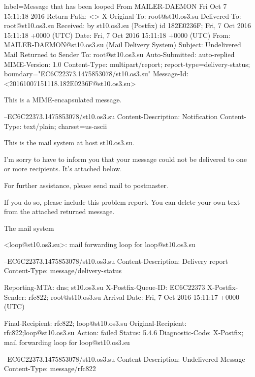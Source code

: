 \documentclass[a4paper,11pt]{article}
\begin{document}
\begin{bashcode*}{label=Message that has been looped}
From MAILER-DAEMON  Fri Oct  7 15:11:18 2016
Return-Path: <>
X-Original-To: root@st10.os3.su
Delivered-To: root@st10.os3.su
Received: by st10.os3.su (Postfix)
  id 182E0236F; Fri,  7 Oct 2016 15:11:18 +0000 (UTC)
Date: Fri,  7 Oct 2016 15:11:18 +0000 (UTC)
From: MAILER-DAEMON@st10.os3.su (Mail Delivery System)
Subject: Undelivered Mail Returned to Sender
To: root@st10.os3.su
Auto-Submitted: auto-replied
MIME-Version: 1.0
Content-Type: multipart/report; report-type=delivery-status;
  boundary="EC6C22373.1475853078/st10.os3.su"
Message-Id: <20161007151118.182E0236F@st10.os3.su>

This is a MIME-encapsulated message.

--EC6C22373.1475853078/st10.os3.su
Content-Description: Notification
Content-Type: text/plain; charset=us-ascii

This is the mail system at host st10.os3.su.

I'm sorry to have to inform you that your message could not
be delivered to one or more recipients. It's attached below.

For further assistance, please send mail to postmaster.

If you do so, please include this problem report. You can
delete your own text from the attached returned message.

                   The mail system

<loop@st10.os3.su>: mail forwarding loop for loop@st10.os3.su

--EC6C22373.1475853078/st10.os3.su
Content-Description: Delivery report
Content-Type: message/delivery-status

Reporting-MTA: dns; st10.os3.su
X-Postfix-Queue-ID: EC6C22373
X-Postfix-Sender: rfc822; root@st10.os3.su
Arrival-Date: Fri,  7 Oct 2016 15:11:17 +0000 (UTC)

Final-Recipient: rfc822; loop@st10.os3.su
Original-Recipient: rfc822;loop@st10.os3.su
Action: failed
Status: 5.4.6
Diagnostic-Code: X-Postfix; mail forwarding loop for loop@st10.os3.su

--EC6C22373.1475853078/st10.os3.su
Content-Description: Undelivered Message
Content-Type: message/rfc822


\end{bashcode*}
\end{document}
